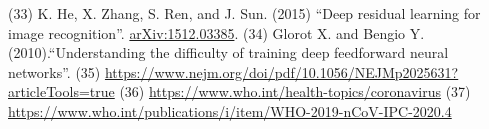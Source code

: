 \documentclass{nle}
\begin{document}
\begin{thebibliography}{}
   (33) K. He, X. Zhang, S. Ren, and J. Sun. (2015) “Deep residual learning for image recognition”. \url{arXiv:1512.03385}.
   (34) Glorot X. and Bengio Y. (2010).“Understanding the difficulty of training deep feedforward neural networks”.
   (35) \url{https://www.nejm.org/doi/pdf/10.1056/NEJMp2025631?articleTools=true}
   (36) \url{https://www.who.int/health-topics/coronavirus}
   (37) \url{https://www.who.int/publications/i/item/WHO-2019-nCoV-IPC-2020.4} 
\end{thebibliography}

\label{lastpage}
\end{document}

